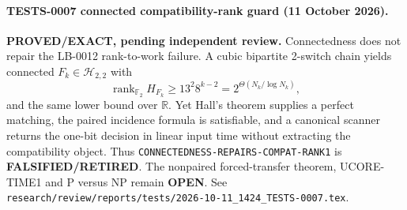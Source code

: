 \paragraph{TESTS-0007 connected compatibility-rank guard (11 October 2026).}
\textbf{PROVED/EXACT, pending independent review.}
Connectedness does not repair the LB-0012 rank-to-work failure.  A cubic
bipartite 2-switch chain yields connected $F_k\in\mathcal H_{2,2}$ with
\[
 \operatorname{rank}_{\mathbb F_2}H_{F_k}
 \ge 13^2 8^{k-2}=2^{\Theta(N_k/\log N_k)},
\]
and the same lower bound over $\mathbb R$.  Yet Hall's theorem supplies a
perfect matching, the paired incidence formula is satisfiable, and a
canonical scanner returns the one-bit decision in linear input time without
extracting the compatibility object.  Thus
\texttt{CONNECTEDNESS-REPAIRS-COMPAT-RANK1} is
\textbf{FALSIFIED/RETIRED}.  The nonpaired forced-transfer theorem,
UCORE-TIME1 and P versus NP remain \textbf{OPEN}.  See
\texttt{research/review/reports/tests/2026-10-11\_1424\_TESTS-0007.tex}.
